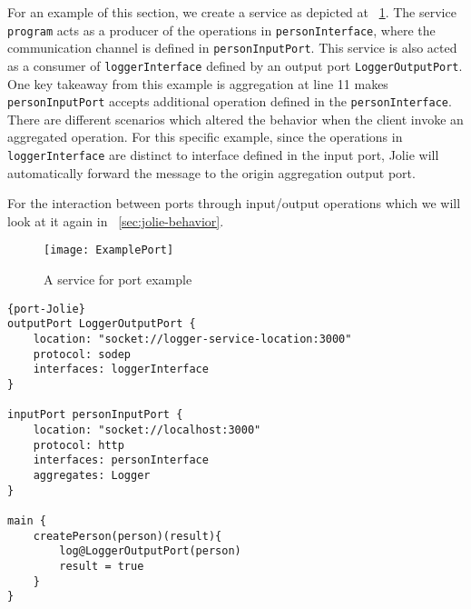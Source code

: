 \FloatBarrier

For an example of this section, we create a service as depicted at ~\ref{list:example-port-graphic}.
The service \texttt{program} acts as a producer of the operations in \texttt{personInterface}, where the communication channel is defined in \texttt{personInputPort}.
This service is also acted as a consumer of \texttt{loggerInterface} defined by an output port \texttt{LoggerOutputPort}.
One key takeaway from this example is aggregation at line 11 makes \texttt{personInputPort} accepts additional operation defined in the \texttt{personInterface}. There are different scenarios which altered the behavior when the client invoke an aggregated operation. For this specific example, since the operations in \texttt{loggerInterface} are distinct to interface defined in the input port, Jolie will automatically forward the message to the origin aggregation output port.

For the interaction between ports through input/output operations which we will look at it again in ~\ref{sec:jolie-behavior}.

\begin{figure}[ht]
    \texttt{[image: ExamplePort]}
    \centering
    \caption{A service for port example}
    \label{list:example-port-graphic}
\end{figure}

\begin{listing}[ht]

    \lstset{language=Jolie,
        style=codeStyle,
        numbers=left,
        firstnumber=1
    }
    \begin{lstlisting}[frame=tlrb, caption= {Jolie Port declaration example}, label={list:example-port} ]{port-Jolie}
outputPort LoggerOutputPort {
    location: "socket://logger-service-location:3000"
    protocol: sodep
    interfaces: loggerInterface
}

inputPort personInputPort {
    location: "socket://localhost:3000"
    protocol: http
    interfaces: personInterface
    aggregates: Logger
}

main {
    createPerson(person)(result){
        log@LoggerOutputPort(person)
        result = true
    }
}
\end{lstlisting}
\end{listing}

\FloatBarrier
